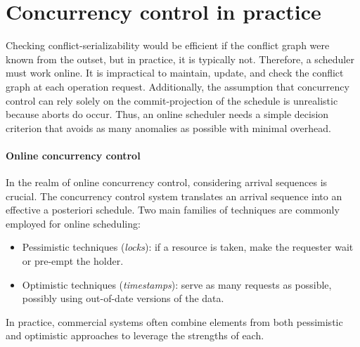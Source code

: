 \section{Concurrency control in practice}

Checking conflict-serializability would be efficient if the conflict graph were known from the outset, but in practice, it is typically not.
Therefore, a scheduler must work online. 
It is impractical to maintain, update, and check the conflict graph at each operation request. 
Additionally, the assumption that concurrency control can rely solely on the commit-projection of the schedule is unrealistic because aborts do occur.
Thus, an online scheduler needs a simple decision criterion that avoids as many anomalies as possible with minimal overhead.

\paragraph*{Online concurrency control}
In the realm of online concurrency control, considering arrival sequences is crucial.
The concurrency control system translates an arrival sequence into an effective a posteriori schedule.
Two main families of techniques are commonly employed for online scheduling:
\begin{itemize}
    \item Pessimistic techniques (\textit{locks}): if a resource is taken, make the requester wait or pre-empt the holder.
    \item Optimistic techniques (\textit{timestamps}): serve as many requests as possible, possibly using out-of-date versions of the data. 
\end{itemize}
In practice, commercial systems often combine elements from both pessimistic and optimistic approaches to leverage the strengths of each.